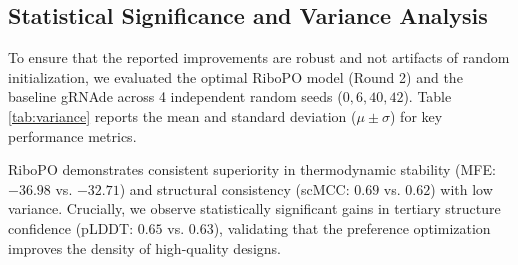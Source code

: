 {{\subsection{{Statistical Significance and Variance Analysis}}
\label{subsec:variance}

{
To ensure that the reported improvements are robust and not artifacts of random initialization, we evaluated the optimal RiboPO model (Round 2) and the baseline gRNAde across 4 independent random seeds ($0, 6, 40, 42$). Table \ref{tab:variance} reports the mean and standard deviation ($\mu \pm \sigma$) for key performance metrics.

RiboPO demonstrates consistent superiority in thermodynamic stability (MFE: $-36.98$ vs. $-32.71$) and structural consistency (scMCC: $0.69$ vs. $0.62$) with low variance. Crucially, we observe statistically significant gains in tertiary structure confidence (pLDDT: $0.65$ vs. $0.63$), validating that the preference optimization improves the density of high-quality designs.

\begin{table}[htbp]
\centering
\caption{Variance Analysis across 4 random seeds ($N=4$). Values represent Mean $\pm$ Standard Deviation. RiboPO achieves statistically significant improvements across both structural and thermodynamic axes.}
\label{tab:variance}
\end{table}
}
































}}
